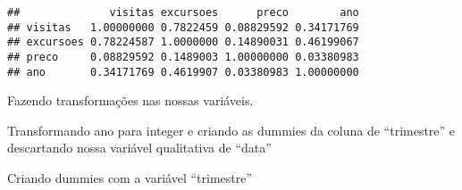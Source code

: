\documentclass[
]{article}
\newenvironment{Shaded}{\begin{snugshade}}{\end{snugshade}}
\newcommand{\CommentTok}[1]{\textcolor[rgb]{0.56,0.35,0.01}{\textit{#1}}}
\newcommand{\ConstantTok}[1]{\textcolor[rgb]{0.00,0.00,0.00}{#1}}
\newcommand{\DecValTok}[1]{\textcolor[rgb]{0.00,0.00,0.81}{#1}}
\newcommand{\FunctionTok}[1]{\textcolor[rgb]{0.00,0.00,0.00}{#1}}
\newcommand{\NormalTok}[1]{#1}
\newcommand{\OtherTok}[1]{\textcolor[rgb]{0.56,0.35,0.01}{#1}}
\newcommand{\SpecialCharTok}[1]{\textcolor[rgb]{0.00,0.00,0.00}{#1}}
\begin{document}
\begin{verbatim}
##              visitas excursoes      preco        ano
## visitas   1.00000000 0.7822459 0.08829592 0.34171769
## excursoes 0.78224587 1.0000000 0.14890031 0.46199067
## preco     0.08829592 0.1489003 1.00000000 0.03380983
## ano       0.34171769 0.4619907 0.03380983 1.00000000
\end{verbatim}

Fazendo transformações nas nossas variáveis.

Transformando ano para integer e criando as dummies da coluna de
``trimestre'' e descartando nossa variável qualitativa de ``data''

\begin{Shaded}
\end{Shaded}

Criando dummies com a variável ``trimestre''

\begin{Shaded}
\end{Shaded}
\end{document}
